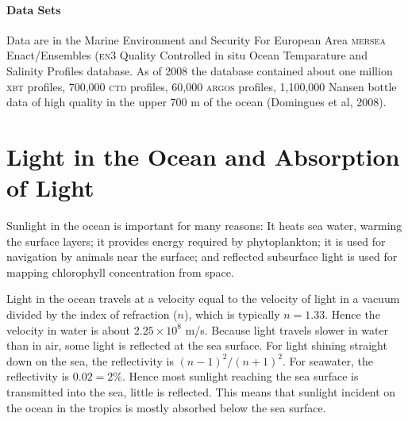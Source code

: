 \paragraph{Data Sets}
Data are in the Marine Environment and Security For European Area
\textsc{mersea} Enact/Ensembles (\textsc{en}3 Quality Controlled in
situ Ocean Temparature and Salinity Profiles database. As of 2008 the
database contained about one million \textsc{xbt} profiles, 700,000
\textsc{ctd} profiles, 60,000 \textsc{argos} profiles, 1,100,000
Nansen bottle data of high quality in the upper 700 m of the ocean
(Domingues et al, 2008).

\section{Light in the Ocean and Absorption of Light}
Sunlight in the ocean is
important for many reasons: It heats sea water, warming the surface
layers; it provides energy required by phytoplankton; it is used for
navigation by animals near the surface; and reflected subsurface light
is used for mapping chlorophyll concentration from space.

Light in the ocean travels at a velocity equal to the velocity of
light in a vacuum divided by the index of refraction ($n$), which is
typically $n = 1.33$.  Hence the velocity in water is about $2.25
\times 10^8$ m/s. Because light travels slower in water than in air,
some light is reflected at the sea surface.  For light shining
straight down on the sea, the reflectivity is $(n - 1)^2 /(n + 1)^2$.
For seawater, the reflectivity is $0.02 = 2$\%. Hence most sunlight
reaching the sea surface is transmitted into the sea, little is
reflected. This means that sunlight incident on the ocean in the
tropics is mostly absorbed below the sea surface.

